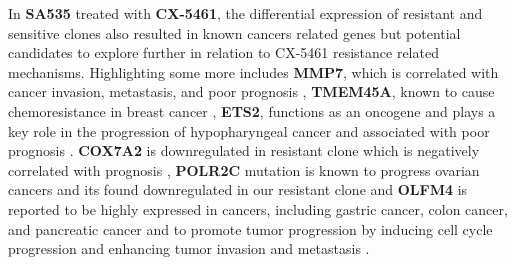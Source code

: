 
In \textbf{SA535} treated with \textbf{CX-5461}, the differential expression of resistant and sensitive clones also resulted in known cancers related genes but potential candidates to explore further in relation to CX-5461 resistance related mechanisms. Highlighting some more includes \textbf{MMP7}, which is correlated with cancer invasion, metastasis, and poor prognosis \cite{mcgowan2008matrix} ,
\textbf{TMEM45A}, known to cause chemoresistance in breast cancer \cite{schmit2019characterization},
\textbf{ETS2}, functions as an oncogene and plays a key role in the progression of hypopharyngeal cancer and associated with poor prognosis \cite{fu2017high, ge2008role}.
\textbf{COX7A2} is downregulated in resistant clone which is negatively correlated with prognosis \cite{deng2018overexpression},
\textbf{POLR2C} mutation is known to progress ovarian cancers and its found downregulated in our resistant clone \cite {moriwaki2017polr2c} and
\textbf{OLFM4} is reported to be highly expressed in cancers, including gastric cancer, colon cancer, and pancreatic cancer and to promote tumor progression by inducing cell cycle progression and enhancing tumor invasion and metastasis \cite{ashizawa2019olfm4}.

